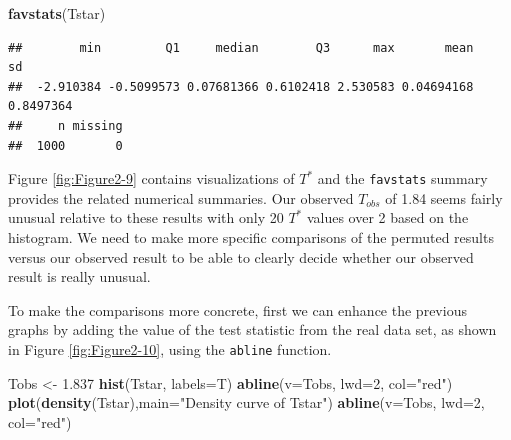 \documentclass[]{book}
\newenvironment{Shaded}{\begin{snugshade}}{\end{snugshade}}
\newcommand{\KeywordTok}[1]{\textcolor[rgb]{0.13,0.29,0.53}{\textbf{{#1}}}}
\newcommand{\DataTypeTok}[1]{\textcolor[rgb]{0.13,0.29,0.53}{{#1}}}
\newcommand{\DecValTok}[1]{\textcolor[rgb]{0.00,0.00,0.81}{{#1}}}
\newcommand{\FloatTok}[1]{\textcolor[rgb]{0.00,0.00,0.81}{{#1}}}
\newcommand{\StringTok}[1]{\textcolor[rgb]{0.31,0.60,0.02}{{#1}}}
\newcommand{\NormalTok}[1]{{#1}}
\begin{document}
\begin{Shaded}
\begin{Highlighting}[]
\KeywordTok{favstats}\NormalTok{(Tstar)}
\end{Highlighting}
\end{Shaded}

\begin{verbatim}
##        min         Q1     median        Q3      max       mean        sd
##  -2.910384 -0.5099573 0.07681366 0.6102418 2.530583 0.04694168 0.8497364
##     n missing
##  1000       0
\end{verbatim}

Figure \ref{fig:Figure2-9} contains visualizations of \(T^*\) and the
\texttt{favstats} summary provides the related numerical summaries. Our
observed \(T_{obs}\) of 1.84 seems fairly unusual relative to these
results with only 20 \(T^*\) values over 2 based on the histogram. We
need to make more specific comparisons of the permuted results versus
our observed result to be able to clearly decide whether our observed
result is really unusual.

To make the comparisons more concrete, first we can enhance the previous
graphs by adding the value of the test statistic from the real data set,
as shown in Figure \ref{fig:Figure2-10}, using the \texttt{abline}
function.





\begin{Shaded}
\begin{Highlighting}[]
\NormalTok{Tobs <-}\StringTok{ }\FloatTok{1.837}
\KeywordTok{hist}\NormalTok{(Tstar, }\DataTypeTok{labels=}\NormalTok{T)}
\KeywordTok{abline}\NormalTok{(}\DataTypeTok{v=}\NormalTok{Tobs, }\DataTypeTok{lwd=}\DecValTok{2}\NormalTok{, }\DataTypeTok{col=}\StringTok{"red"}\NormalTok{)}
\KeywordTok{plot}\NormalTok{(}\KeywordTok{density}\NormalTok{(Tstar),}\DataTypeTok{main=}\StringTok{"Density curve of Tstar"}\NormalTok{)}
\KeywordTok{abline}\NormalTok{(}\DataTypeTok{v=}\NormalTok{Tobs, }\DataTypeTok{lwd=}\DecValTok{2}\NormalTok{, }\DataTypeTok{col=}\StringTok{"red"}\NormalTok{)}
\end{Highlighting}
\end{Shaded}
\end{document}
